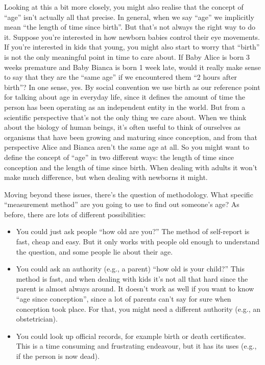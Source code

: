 \documentclass[
  a4paper,
]{book}
\providecommand{\tightlist}{%
  \setlength{\itemsep}{0pt}\setlength{\parskip}{0pt}}
\begin{document}
Looking at this a bit more closely, you might also realise that the
concept of ``age'' isn't actually all that precise. In general, when we
say ``age'' we implicitly mean ``the length of time since birth''. But
that's not always the right way to do it. Suppose you're interested in
how newborn babies control their eye movements. If you're interested in
kids that young, you might also start to worry that ``birth'' is not the
only meaningful point in time to care about. If Baby Alice is born 3
weeks premature and Baby Bianca is born 1 week late, would it really
make sense to say that they are the ``same age'' if we encountered them
``2 hours after birth''? In one sense, yes. By social convention we use
birth as our reference point for talking about age in everyday life,
since it defines the amount of time the person has been operating as an
independent entity in the world. But from a scientific perspective
that's not the only thing we care about. When we think about the biology
of human beings, it's often useful to think of ourselves as organisms
that have been growing and maturing since conception, and from that
perspective Alice and Bianca aren't the same age at all. So you might
want to define the concept of ``age'' in two different ways: the length
of time since conception and the length of time since birth. When
dealing with adults it won't make much difference, but when dealing with
newborns it might.

Moving beyond these issues, there's the question of methodology. What
specific ``measurement method'' are you going to use to find out
someone's age? As before, there are lots of different possibilities:

\begin{itemize}
\tightlist
\item
  You could just ask people ``how old are you?'' The method of
  self-report is fast, cheap and easy. But it only works with people old
  enough to understand the question, and some people lie about their
  age.
\item
  You could ask an authority (e.g., a parent) ``how old is your child?''
  This method is fast, and when dealing with kids it's not all that hard
  since the parent is almost always around. It doesn't work as well if
  you want to know ``age since conception'', since a lot of parents
  can't say for sure when conception took place. For that, you might
  need a different authority (e.g., an obstetrician).
\item
  You could look up official records, for example birth or death
  certificates. This is a time consuming and frustrating endeavour, but
  it has its uses (e.g., if the person is now dead).
\end{itemize}
\end{document}
